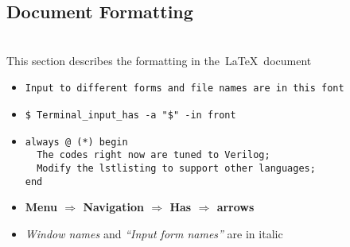 
\subsection *{Document Formatting}
\label{subsec:doc_format}
\hrulefill \\
This section describes the formatting in the~\LaTeX~document
\begin{itemize}
\item \verb+Input to different forms and file names are in this font+ 
\item \verb+$ Terminal_input_has -a "$" -in front+ 
\item[] 
\begin{lstlisting}
always @ (*) begin
  The codes right now are tuned to Verilog;
  Modify the lstlisting to support other languages;
end
\end{lstlisting}
\item \textbf{Menu $\Rightarrow$ Navigation $\Rightarrow$ Has 
  $\Rightarrow$ arrows}
\item \textit{Window names} and \textit{``Input form names''} are in italic
\end{itemize}
\hrulefill
